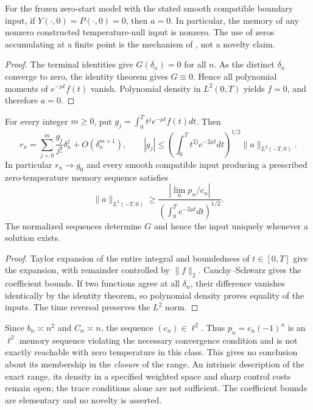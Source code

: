 \begin{proposition}\label{prop:fullzero}
For the frozen zero-start model with the stated smooth compatible boundary input, if \(Y(\cdot,0)=P(\cdot,0)=0\), then \(a=0\). In particular, the memory of any nonzero constructed temperature-null input is nonzero. The use of zeros accumulating at a finite point is the mechanism of \cite[Obstruction 1, p.~6]{IvanovPandolfi2009}, not a novelty claim.
\end{proposition}
\begin{proof}
The terminal identities give \(G(\delta_n)=0\) for all \(n\). As the distinct \(\delta_n\) converge to zero, the identity theorem gives \(G\equiv0\). Hence all polynomial moments of \(e^{-\mu t}f(t)\) vanish. Polynomial density in \(L^2(0,T)\) yields \(f=0\), and therefore \(a=0\).
\end{proof}
\begin{proposition}\label{prop:asymptotic}
For every integer \(m\ge0\), put \(g_j=\int_0^T t^j e^{-\mu t} f(t)dt\). Then
\[
r_n=\sum_{j=0}^{m}\frac{g_j}{j!}\delta_n^j+O(\delta_n^{m+1}),\qquad
|g_j|\le\left(\int_0^T t^{2j}e^{-2\mu t}dt\right)^{1/2}\|a\|_{L^2(-T,0)}.
\]
In particular \(r_n\to g_0\) and every smooth compatible input producing a prescribed zero-temperature memory sequence satisfies
\[
\|a\|_{L^2(-T,0)}\ge \frac{|\lim_n p_n/c_n|}{\left(\int_0^T e^{-2\mu t}dt\right)^{1/2}}.
\]
The normalized sequences determine \(G\) and hence the input uniquely whenever a solution exists.
\end{proposition}
\begin{proof}
Taylor expansion of the entire integral and boundedness of \(t\in[0,T]\) give the expansion, with remainder controlled by \(\|f\|_2\). Cauchy--Schwarz gives the coefficient bounds. If two functions agree at all \(\delta_n\), their difference vanishes identically by the identity theorem, so polynomial density proves equality of the inputs. The time reversal preserves the \(L^2\) norm.
\end{proof}
Since \(b_n\asymp n^2\) and \(C_n\asymp n\), the sequence \((c_n)\in\ell^2\). Thus \(p_n=c_n(-1)^n\) is an \(\ell^2\) memory sequence violating the necessary convergence condition and is not exactly reachable with zero temperature in this class. This gives no conclusion about its membership in the \emph{closure} of the range. An intrinsic description of the exact range, its density in a specified weighted space and sharp control costs remain open; the trace conditions alone are not sufficient. The coefficient bounds are elementary and no novelty is asserted.

